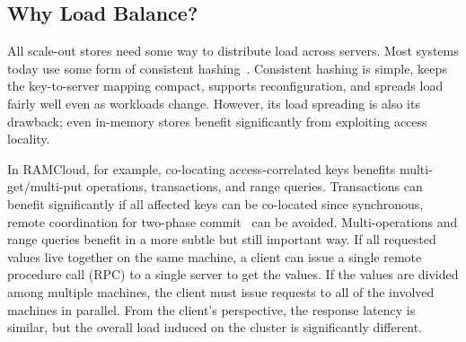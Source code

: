 %


\subsection{Why Load Balance?}
\label{sec:why-balance}

All scale-out stores need some way to distribute load across servers.
Most systems today use
some form of consistent
hashing~\cite{chord,dynamo,cassandra}. Consistent hashing is simple,
keeps the key-to-server mapping compact, supports reconfiguration, and
spreads load fairly well even as workloads change. However, its
load spreading is also its drawback; even in-memory stores benefit
significantly from exploiting access locality.

In RAMCloud, for example, co-locating access-correlated keys benefits
multi-get/multi-put operations, transactions, and range queries. Transactions can
benefit significantly if all affected keys can be co-located since
synchronous, remote
coordination for two-phase commit~\cite{ramcloud-rifl,sinfonia} can be avoided.
Multi-operations and range queries benefit in a more subtle but still important
way. If all requested values live together on the same machine, a client can
issue a single remote procedure call (RPC) to a single server to get
the values. If the values are divided among multiple machines, the client must
issue requests to all of the involved machines in parallel. From the client's
perspective, the response latency is similar, but the overall load
induced on the cluster is significantly different.

